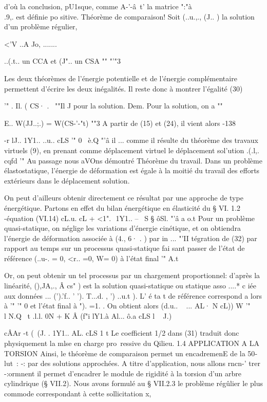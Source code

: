 {{{d'où la conclusion, pU1sque, comme A-'-â~t' la matrice ":"à\\.9,. est définie po
sitive. 
Théorème de comparaison! Soit (..u.,., (J.. ) la solution d'un problème régulier, 

<'V ..A Jo, ....... ~ 

..(.t.. un CCA et (J".. un CSA 
"" "'"3 

Les deux théorèmes de l'énergie potentielle et de l'énergie com­plémentaire permettent d'écrire les deux inégalités. Il reste donc à montrer 
l'égalité 
(30) 

'" . Il. ( CS· . \ 
""Il J 
pour la solution. 
Dem. Pour la solution, on a 
"" 

E..
W(JJ..;.) = W(CS-'-"t) 
""3 
A partir de (15) et (24), il vient alors 
-138 


-r lJ.. 1Y1.. ..u.. cLS 
'" 0
~è.Q "'â il ... 
comme il résulte du théorème des travaux virtuels (9), en prenant comme dé­placement virtuel le déplacement sol'ution .(.l,. cqfd
'" 
Au passage nous aVOns démontré 
Théorème du travail. Dans un problème élastostatique, l'énergie de déforma­tion est égale à la moitié du travail des efforts extérieurs dans le dépla­cement solution. 

On peut d'ailleurs obtenir directement ce résultat par une appro­che de type énergétique. Partons en effet du bilan énergétique en élasticité du § VI. 1.2 -équation (VI.14) 
cL.u. cL
+ <1".  1Y1.. --~ S
§
ôSl. "'â a o.t 
Pour un problème quasi-statique, on néglige les variations d'énergie cinéti­que, et on obtiendra l'énergie de déformation associée à (4., 6· . ) par in
... "'II 
tégration de (32) par rapport au temps sur un processus quasi-statique fai
sant passer de l'état de référence (..u-. = 0, <r.. =0, W= 0) à l'état final 
'" A.t 


Or, on peut obtenir un tel processus par un chargement proportionnel: d'après la linéarité, (),JA,., Â cs" ) est la solution quasi-statique ou statique asso
....* 
c iée  aux  données  ... (').'f..  '  '). T...d.  , ') ..u.t ). L' é ta t  de  référence correspond  a lors  à  
'"  '" 0  et  l'état  final  à  ").  =1.  .  On  obtient alors  (d.u.. ~ ...  AL· N  cL))  
W  '"  ~ ~  l N.Q~ t .l.l. 0N­ + K Â (f"i lY1.à Al... ô.a  cLS l ~  J.)  


cÂAr -t (\ (J. . 1Y1.. AL. cLS 1 
t %
Le coefficient 1/2 dans (31) traduit donc physiquement la mlse en charge pro­~ressive du Qilieu. 
1.4 APPLICATION A LA TORSION 
Ainsi, le théorème de comparaison permet un encadremenE de la 50­lut~: -: par des solutions approchées. A titre d'application, nous allons rncn-' 
trer -:ormnent il permet d'encadrer le module de rigidité à la torsion d'un arbre cylindrique (§ VII.2). Nous avons formulé au § VII.2.3 le problème ré­gûlier le plus commode correspondant à cette sollicitation 
x, 

}}}
